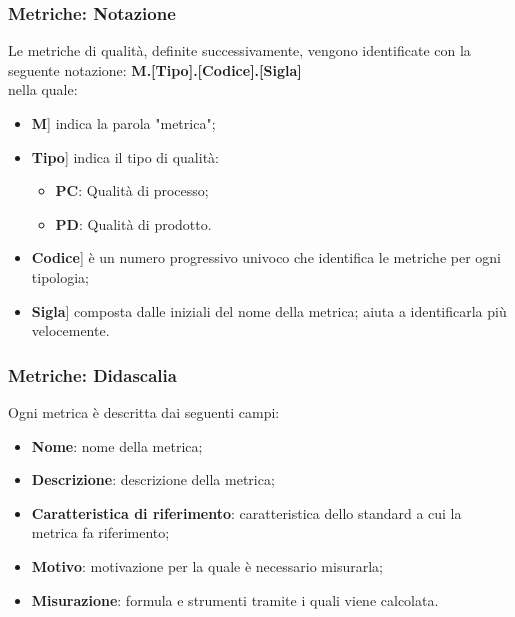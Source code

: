 \documentclass[10pt, a4paper]{article}
\begin{document}
\subsubsection{Metriche: Notazione}
Le metriche di qualità, definite successivamente, vengono identificate con la seguente notazione:
\textbf{M.[Tipo].[Codice].[Sigla]}\\
nella quale:
\begin{itemize}
\item \lbrack \textbf{M}] indica la parola "metrica";
\item \lbrack \textbf{Tipo}] indica il tipo di qualità:
\begin{itemize}
    \item \textbf{PC}: Qualità di processo;
    \item \textbf{PD}: Qualità di prodotto.
\end{itemize}
\item \lbrack \textbf{Codice}] è un numero progressivo univoco che identifica le metriche per ogni tipologia;
\item \lbrack \textbf{Sigla}] composta dalle iniziali del nome della metrica; aiuta a identificarla più velocemente.
\end{itemize}

\subsubsection{Metriche: Didascalia}
Ogni metrica è descritta dai seguenti campi:
\begin{itemize}
    \item \textbf{Nome}: nome della metrica;
    \item \textbf{Descrizione}: descrizione della metrica;
    \item \textbf{Caratteristica di riferimento}: caratteristica dello standard a cui la metrica fa riferimento;
    \item \textbf{Motivo}: motivazione per la quale è necessario misurarla;
    \item \textbf{Misurazione}: formula e strumenti tramite i quali viene calcolata.
\end{itemize}
\end{document}
